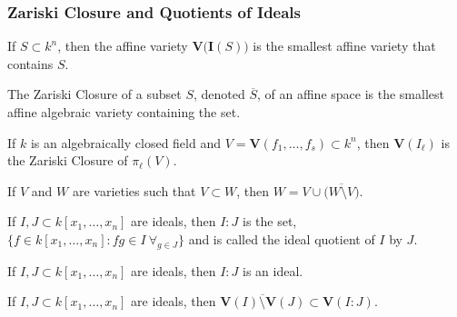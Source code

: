            \subsubsection{Zariski Closure and Quotients of Ideals}
                \begin{theorem}
                        If $S\subset k^n$, then the affine variety
                        $\mathbf{V}\big(\textbf{I}(S)\big)$ is
                        the smallest affine variety that contains $S$.
                \end{theorem}
                \begin{definition}
                    The Zariski Closure of a subset $S$,
                    denoted $\overline{S}$, of an affine space
                    is the smallest affine algebraic variety
                    containing the set. 
                \end{definition}
                \begin{theorem}
                    If $k$ is an algebraically closed field
                    and $V=\mathbf{V}(f_1,\hdots, f_s)\subset k^n$,
                    then $\mathbf{V}(I_{\ell})$ is the Zariski Closure
                    of $\pi_{\ell}(V)$.
                \end{theorem}
                \begin{theorem}
                    If $V$ and $W$ are varieties such that
                    $V\subset W$,
                    then $W=V\cup \overline{\big(W\setminus V\big)}$.
                \end{theorem}
                \begin{definition}
                    If $I,J\subset k[x_1,\hdots ,x_n]$ are ideals,
                    then $I:J$ is the set,
                    $\{f\in k[x_1,\hdots ,x_n]: fg \in I\ \forall_{g\in J}\}$
                    and is called the ideal quotient of $I$ by $J$.
                \end{definition}
                \begin{theorem}
                    If $I,J\subset k[x_1,\hdots ,x_n]$ are ideals,
                    then $I:J$ is an ideal.
                \end{theorem}
                \begin{theorem}
                    If $I,J\subset k[x_1,\hdots ,x_n]$ are ideals,
                    then
                    $\overline{\mathbf{V}(I)\setminus%
                     \mathbf{V}(J)}\subset\mathbf{V}(I:J)$.
                \end{theorem}
